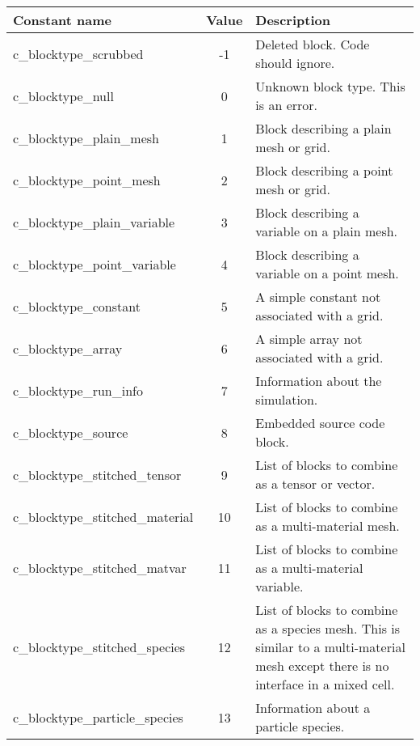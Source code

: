 \documentclass[12pt]{article}
\begin{document}
\begin{center}
\begin{tabularx}{0.9\textwidth}[!hbt]{lcX}
  Constant name & Value & Description
  \\\toprule

  c\_blocktype\_scrubbed & -1 & Deleted block. Code should ignore.
  \\\midrule

  c\_blocktype\_null & 0 & Unknown block type. This is an error.
  \\\midrule

  c\_blocktype\_plain\_mesh & 1 & Block describing a plain mesh or grid.
  \\\midrule

  c\_blocktype\_point\_mesh & 2 & Block describing a point mesh or grid.
  \\\midrule

  c\_blocktype\_plain\_variable & 3 & Block describing a variable on
  a plain mesh.
  \\\midrule

  c\_blocktype\_point\_variable & 4 & Block describing a variable on
  a point mesh.
  \\\midrule

  c\_blocktype\_constant & 5 & A simple constant not associated with a grid.
  \\\midrule

  c\_blocktype\_array & 6 & A simple array not associated with a grid.
  \\\midrule

  c\_blocktype\_run\_info & 7 & Information about the simulation.
  \\\midrule

  c\_blocktype\_source & 8 & Embedded source code block.
  \\\midrule

  c\_blocktype\_stitched\_tensor & 9 & List of blocks to combine as a tensor
  or vector.
  \\\midrule

  c\_blocktype\_stitched\_material & 10 & List of blocks to combine as a
  multi-material mesh.
  \\\midrule

  c\_blocktype\_stitched\_matvar & 11 & List of blocks to combine as a
  multi-material variable.
  \\\midrule

  c\_blocktype\_stitched\_species & 12 & List of blocks to combine as a
  species mesh. This is similar to a multi-material mesh except there is
  no interface in a mixed cell.
  \\\midrule

  c\_blocktype\_particle\_species & 13 & Information about a particle species.
\end{tabularx}
\end{center}\vspace{10pt}
\end{document}
